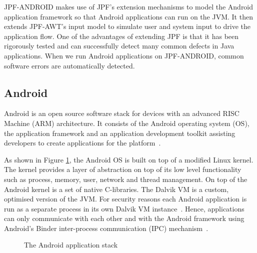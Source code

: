 \documentclass{acm_proc_article-sp}
\begin{document}
JPF-ANDROID makes use of JPF's extension mechanisms to model the Android application framework so that Android applications can run on the
JVM. It then extends JPF-AWT's input model to simulate user and system input to drive the application flow. One of the advantages of
extending JPF is that it has been rigorously tested and can successfully detect many common defects in Java applications. When we run
Android applications on JPF-ANDROID, common software errors are automatically detected.


\subsection{Android}
Android is an open source software stack for devices with an advanced RISC Machine (ARM) architecture.
It consists of the Android operating system (OS), the application framework and an application development toolkit assisting developers to create
applications for the platform~\cite{AndroidDocs}.

As shown in Figure \ref{fig:android}, the Android OS is built on top of a modified Linux kernel. The kernel provides a layer of abstraction
on top of its low level functionality such as process, memory, user, network and thread management. On top of the Android kernel is a set of
native C-libraries. The Dalvik VM is a custom, optimised version of the JVM. For security reasons each Android application is run as a
separate process in its own Dalvik VM instance~\cite{AndroidSecurity}.  Hence, applications can only communicate with each other and with
the Android framework using Android's Binder inter-process communication (IPC) mechanism~\cite{Binder}. 

\begin{figure}
\centering
{}
\caption{The Android application stack~\cite{systemserver}}
\label{fig:android}
\end{figure}
\end{document}
